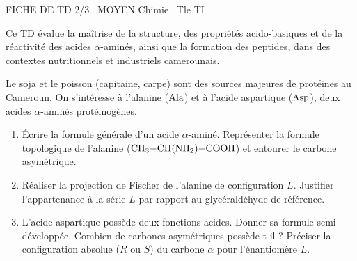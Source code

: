 \documentclass[11pt]{article}
\begin{document}
\begin{tcolorbox}[enhanced,colback=popink,colframe=popink,arc=10pt,boxrule=0pt,left=12pt,right=12pt,top=9pt,bottom=9pt]
{\color{white}\popxbold\small FICHE DE TD 2/3 \textbullet\ MOYEN \hfill Chimie \textbullet\ Tle TI\par}
\end{tcolorbox}
\vspace{4pt}
\noindent Ce TD évalue la maîtrise de la structure, des propriétés acido-basiques et de la réactivité des acides $\alpha$-aminés, ainsi que la formation des peptides, dans des contextes nutritionnels et industriels camerounais.

\begin{exercice}
Le soja et le poisson (capitaine, carpe) sont des sources majeures de protéines au Cameroun. On s'intéresse à l'alanine ($\ce{Ala}$) et à l'acide aspartique ($\ce{Asp}$), deux acides $\alpha$-aminés protéinogènes.
\begin{enumerate}
    \item Écrire la formule générale d'un acide $\alpha$-aminé. Représenter la formule topologique de l'alanine ($\ce{CH3-CH(NH2)-COOH}$) et entourer le carbone asymétrique. 
    \item Réaliser la projection de Fischer de l'alanine de configuration $L$. Justifier l'appartenance à la série $L$ par rapport au glycéraldéhyde de référence.
    \item L'acide aspartique possède deux fonctions acides. Donner sa formule semi-développée. Combien de carbones asymétriques possède-t-il ? Préciser la configuration absolue ($R$ ou $S$) du carbone $\alpha$ pour l'énantiomère $L$.
\end{enumerate}
\end{exercice}
\end{document}
